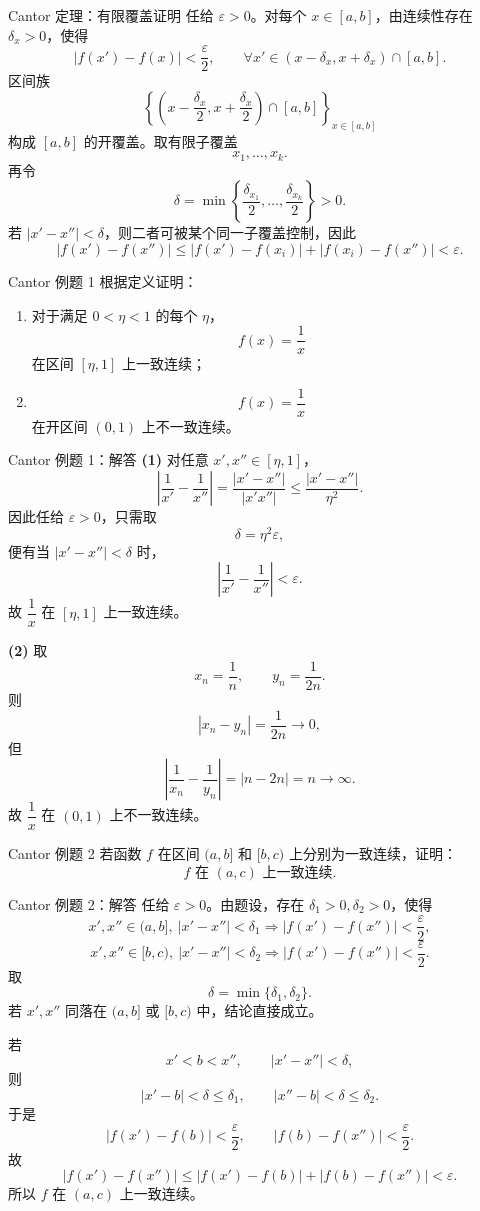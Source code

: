 ﻿\documentclass[aspectratio=169,11pt]{ctexbeamer}
\begin{document}
\begin{frame}{Cantor 定理：有限覆盖证明}
任给 $\varepsilon>0$。对每个 $x\in[a,b]$，由连续性存在 $\delta_x>0$，使得
\[
  |f(x')-f(x)|<\frac{\varepsilon}{2},
  \qquad \forall x'\in(x-\delta_x,x+\delta_x)\cap[a,b].
\]
区间族
\[
  \left\{\left(x-\frac{\delta_x}{2},x+\frac{\delta_x}{2}\right)\cap[a,b]\right\}_{x\in[a,b]}
\]
构成 $[a,b]$ 的开覆盖。取有限子覆盖
\[
  x_1,\dots,x_k.
\]
再令
\[
  \delta=\min\left\{\frac{\delta_{x_1}}2,\dots,\frac{\delta_{x_k}}2\right\}>0.
\]
若 $|x'-x''|<\delta$，则二者可被某个同一子覆盖控制，因此
\[
  |f(x')-f(x'')|
  \le |f(x')-f(x_i)|+|f(x_i)-f(x'')|
  <\varepsilon.
\]
\end{frame}

\begin{frame}{Cantor 例题 1}
根据定义证明：
\begin{enumerate}
  \item 对于满足 $0<\eta<1$ 的每个 $\eta$，
  \[
    f(x)=\frac1x
  \]
  在区间 $[\eta,1]$ 上一致连续；
  \item
  \[
    f(x)=\frac1x
  \]
  在开区间 $(0,1)$ 上不一致连续。
\end{enumerate}
\end{frame}

\begin{frame}[allowframebreaks]{Cantor 例题 1：解答}
\textbf{(1)} 对任意 $x',x''\in[\eta,1]$，
\[
  \left|\frac1{x'}-\frac1{x''}\right|
  =
  \frac{|x'-x''|}{|x'x''|}
  \le \frac{|x'-x''|}{\eta^2}.
\]
因此任给 $\varepsilon>0$，只需取
\[
  \delta=\eta^2\varepsilon,
\]
便有当 $|x'-x''|<\delta$ 时，
\[
  \left|\frac1{x'}-\frac1{x''}\right|<\varepsilon.
\]
故 $\dfrac1x$ 在 $[\eta,1]$ 上一致连续。
\vspace{0.5em}

\textbf{(2)} 取
\[
  x_n=\frac1n,\qquad y_n=\frac1{2n}.
\]
则
\[
  |x_n-y_n|=\frac1{2n}\to 0,
\]
但
\[
  \left|\frac1{x_n}-\frac1{y_n}\right|=|n-2n|=n\to\infty.
\]
故 $\dfrac1x$ 在 $(0,1)$ 上不一致连续。
\end{frame}

\begin{frame}{Cantor 例题 2}
若函数 $f$ 在区间 $(a,b]$ 和 $[b,c)$ 上分别为一致连续，证明：
\[
  f \text{ 在 }(a,c)\text{ 上一致连续}.
\]
\end{frame}

\begin{frame}[allowframebreaks]{Cantor 例题 2：解答}
任给 $\varepsilon>0$。由题设，存在 $\delta_1>0,\delta_2>0$，使得
\[
  x',x''\in(a,b],\ |x'-x''|<\delta_1
  \Longrightarrow
  |f(x')-f(x'')|<\frac{\varepsilon}{2},
\]
\[
  x',x''\in[b,c),\ |x'-x''|<\delta_2
  \Longrightarrow
  |f(x')-f(x'')|<\frac{\varepsilon}{2}.
\]
取
\[
  \delta=\min\{\delta_1,\delta_2\}.
\]
若 $x',x''$ 同落在 $(a,b]$ 或 $[b,c)$ 中，结论直接成立。
\vspace{0.5em}

若
\[
  x'<b<x'',\qquad |x'-x''|<\delta,
\]
则
\[
  |x'-b|<\delta\le \delta_1,\qquad |x''-b|<\delta\le \delta_2.
\]
于是
\[
  |f(x')-f(b)|<\frac{\varepsilon}{2},\qquad |f(b)-f(x'')|<\frac{\varepsilon}{2}.
\]
故
\[
  |f(x')-f(x'')|
  \le |f(x')-f(b)|+|f(b)-f(x'')|
  <\varepsilon.
\]
所以 $f$ 在 $(a,c)$ 上一致连续。
\end{frame}
\end{document}
